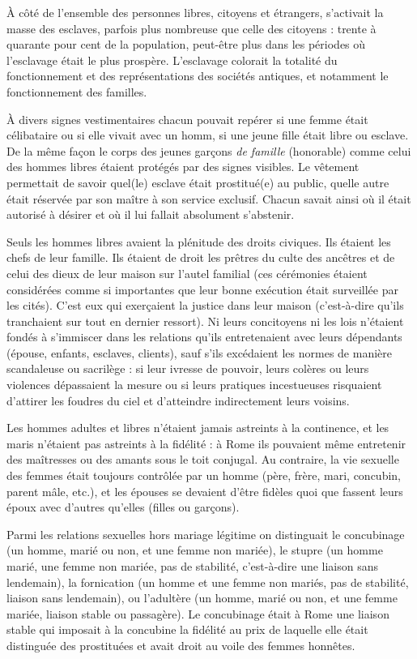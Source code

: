 À côté de l'ensemble des personnes libres, citoyens et étrangers,
s'activait la masse des esclaves, parfois plus nombreuse que celle des citoyens :
 trente à quarante pour cent de la population, peut-être plus dans
les périodes où l'esclavage était le plus prospère. L'esclavage colorait la
totalité du fonctionnement et des représentations des sociétés antiques,
et notamment le fonctionnement des familles.

À divers signes vestimentaires chacun pouvait repérer si une
femme était célibataire ou si elle vivait avec un homm, si une jeune fille était
libre ou esclave. De la même façon le corps des jeunes garçons \emph{de famille} (honorable)
comme celui des hommes libres étaient protégés par des signes visibles.
Le vêtement permettait de savoir quel(le) esclave était prostitué(e)
au public, quelle autre était réservée par son maître à son service exclusif.
Chacun savait ainsi où il était autorisé à désirer et où il lui fallait absolument s'abstenir.

Seuls les hommes libres avaient la plénitude des droits civiques. Ils
étaient les chefs de leur famille.
Ils étaient de droit les prêtres du culte des ancêtres et de celui des dieux
de leur maison sur l'autel familial (ces cérémonies étaient considérées comme si importantes
que leur bonne exécution était surveillée par les cités). C'est eux qui exerçaient
la justice dans leur maison (c'est-à-dire qu'ils tranchaient sur tout en dernier ressort). Ni leurs concitoyens ni les lois
n'étaient fondés à s'immiscer dans les relations qu'ils entretenaient avec
leurs dépendants (épouse, enfants, esclaves, clients), sauf s'ils excédaient
les normes de manière scandaleuse ou sacrilège : si leur ivresse de pouvoir, leurs colères ou leurs violences dépassaient la mesure  ou si leurs pratiques incestueuses
risquaient d'attirer les foudres du ciel et d'atteindre indirectement leurs
voisins.

Les hommes adultes et libres n'étaient jamais astreints à la continence,
et les maris n'étaient pas astreints à la fidélité : à Rome ils pouvaient
même entretenir des maîtresses ou des amants sous le toit conjugal.
Au contraire, la vie sexuelle des femmes était toujours contrôlée par
un homme (père, frère, mari, concubin, parent mâle, etc.), et les épouses se devaient
d'être fidèles quoi que fassent leurs époux avec d'autres qu'elles (filles ou garçons).

Parmi les relations sexuelles hors mariage légitime on distinguait le concubinage (un homme, marié ou non, et une
femme non mariée), le stupre (un homme 
marié, une femme non mariée, pas de stabilité, c'est-à-dire une liaison sans lendemain), la fornication (un homme et une femme 
non mariés, pas de stabilité, liaison sans lendemain), ou l'adultère (un homme, marié ou non, et une femme mariée, liaison stable ou passagère). Le concubinage était à Rome une liaison stable qui imposait à la concubine la fidélité au prix de laquelle elle était distinguée des prostituées et avait droit au voile des femmes honnêtes.




